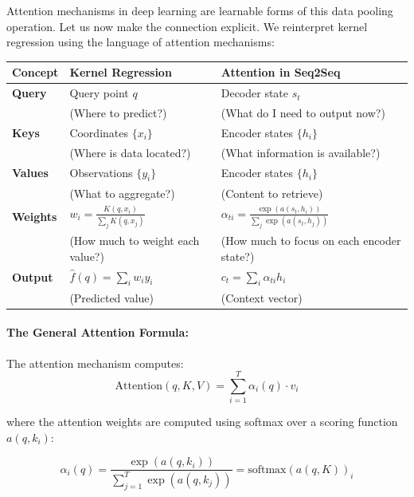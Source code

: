 \documentclass{article}
\begin{document}
Attention mechanisms in deep learning are  learnable forms of this data pooling operation.
Let us now make the connection explicit. We reinterpret kernel regression using the language of attention mechanisms:

\begin{center}
\begin{tabular}{|l|l|l|}
\hline
\textbf{Concept} & \textbf{Kernel Regression} & \textbf{Attention in Seq2Seq} \\
\hline
\textbf{Query} & Query point $q$ & Decoder state $s_t$ \\
 & (Where to predict?) & (What do I need to output now?) \\
\hline
\textbf{Keys} & Coordinates $\{x_i\}$ & Encoder states $\{h_i\}$ \\
 & (Where is data located?) & (What information is available?) \\
\hline
\textbf{Values} & Observations $\{y_i\}$ & Encoder states $\{h_i\}$ \\
 & (What to aggregate?) & (Content to retrieve) \\
\hline
\textbf{Weights} & $w_i = \frac{K(q, x_i)}{\sum_j K(q, x_j)}$ & $\alpha_{ti} = \frac{\exp(a(s_t, h_i))}{\sum_j \exp(a(s_t, h_j))}$ \\
 & (How much to weight each value?) & (How much to focus on each encoder state?) \\
\hline
\textbf{Output} & $\hat{f}(q) = \sum_i w_i y_i$ & $c_t = \sum_i \alpha_{ti} h_i$ \\
 & (Predicted value) & (Context vector) \\
\hline
\end{tabular}
\end{center}


\paragraph{The General Attention Formula:}
The attention mechanism computes:
\begin{equation}
\text{Attention}(q, K, V) = \sum_{i=1}^{T} \alpha_i(q) \cdot v_i
\end{equation}

where the attention weights are computed using softmax over a scoring function $a(q, k_i)$:

\begin{equation}
\alpha_i(q) = \frac{\exp(a(q, k_i))}{\sum_{j=1}^{T} \exp(a(q, k_j))} = \text{softmax}(a(q, K))_i
\end{equation}
\end{document}
